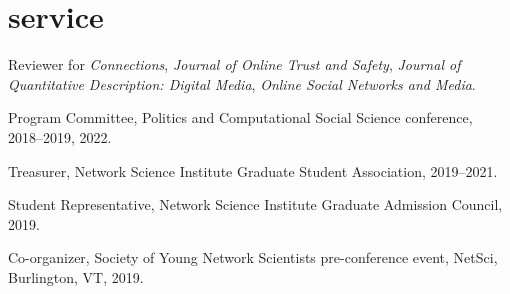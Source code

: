 \documentclass[11pt, letter]{article}
\begin{document}
 \section{service}
 Reviewer for \textit{Connections}, \textit{Journal of Online Trust and Safety}, \textit{Journal of Quantitative Description: Digital Media}, \textit{Online Social Networks and Media}.

 Program Committee, Politics and Computational Social Science conference, 2018--2019, 2022.

 Treasurer, Network Science Institute Graduate Student Association, 2019--2021.

 Student Representative, Network Science Institute Graduate Admission Council, 2019.

 Co-organizer, Society of Young Network Scientists pre-conference event, NetSci, Burlington, VT, 2019.
\end{document}
